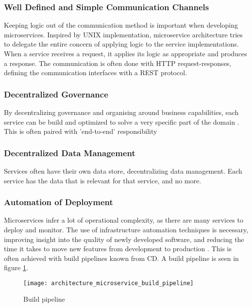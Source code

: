 {\subsubsection*{Well Defined and Simple Communication Channels}
Keeping logic out of the communication method is important when developing microservices. Inspired by UNIX implementation, microservice architecture tries to delegate the entire concern of applying logic to the service implementations. When a service receives a request, it applies its logic as appropriate and produces a response. The communication is often done with HTTP request-responses, defining the communication interfaces with a REST protocol\cite{fowler2014microservices}.

\subsubsection*{Decentralized Governance}
By decentralizing governance and organising around business capabilities, each service can be build and optimized to solve a very specific part of the domain \cite{fowler2014microservices}.
This is often paired with 'end-to-end' responsibility 

\subsubsection*{Decentralized Data Management}
Services often have their own data store, decentralizing data management. Each service has the data that is relevant for that service, and no more. 

\subsubsection*{Automation of Deployment}
Microservices infer a lot of operational complexity, as there are many services to deploy and monitor. The use of infrastructure automation techniques is necessary, improving insight into the quality of newly developed software, and reducing the time it takes to move new features from development to production \cite{newman2015microservices}. This is often achieved with build pipelines known from CD. A build pipeline is seen in figure \ref{fig:architecture_microservice_build_pipeline}.

\begin{figure}[!htb]
  \texttt{[image: architecture\_microservice\_build\_pipeline]}  
  \caption{Build pipeline \cite{newman2015microservices}}
  \label{fig:architecture_microservice_build_pipeline}
\end{figure}

}
